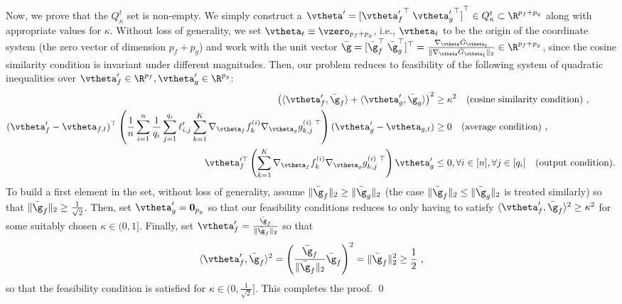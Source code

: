 Now, we prove that the $Q^t_{\kappa}$ set is non-empty. 
We simply construct a $\vtheta'={[{\vtheta'_f}^{\top}\;{\vtheta'_g}^{\top}]}^{\top} \in Q^t_{\kappa}\subset \R^{p_f+p_q}$ along with appropriate values for $\kappa$. Without loss of generality, we set $\vtheta_t\equiv \vzero_{p_f+p_g}$, i.e., $\vtheta_t$ to be the origin of the coordinate system (the zero vector of dimension $p_f+p_g$) and work with the unit vector $\bar{\g} = [\bar{\g}_f^{\top}\;\bar{\g}_g^{\top}]^{\top} =  \frac{\nabla_{\vtheta} \bar{G}_{\vtheta_t}}{\| \nabla_{\vtheta} \bar{G}_{\vtheta_t}\|_2}\in\R^{p_f+p_g}$, since the cosine similarity condition is invariant under different magnitudes. 
Then, our problem reduces to feasibility of the following system of quadratic inequalities over $\vtheta'_f \in \R^{p_f}, \vtheta'_g \in \R^{p_g}$:
\begin{align*}
  \left( \langle \vtheta'_f , \bar{\g}_f \rangle + \langle \vtheta'_g , \bar{\g}_g \rangle \right)^2  & \geq \kappa^2 \quad \text{(cosine similarity condition)}~, \\
  (\vtheta'_f-\vtheta_{f,t})^\top\left(\frac{1}{n} \sum_{i=1}^n \frac{1}{q_i} \sum_{j=1}^{q_i} \ell'_{i,j} \sum_{k=1}^K \nabla_{\vtheta_{f}} f_k^{(i)} \nabla_{\vtheta_{g}} g_{k,j}^{(i)~\top}\right)(\vtheta'_g-\vtheta_{g,t})  &\geq 0\quad \text{(average condition)}~,\\
  \vtheta_f^{\prime\top}\left( \sum_{k=1}^K \nabla_{\vtheta_{f}} f_k^{(i)} \nabla_{\vtheta_{g}} g_{k,j}^{(i)~\top}\right)\vtheta'_g&\leq 0,\forall i\in[n],\forall j\in[q_i]
\quad \text{(output condition)}.
\end{align*}
%
%
To build a first element in the set, without loss of generality, assume $\| \bar{\g}_f\|_2 \geq \| \bar{\g}_g \|_2$ (the case $\| \bar{\g}_f\|_2 \leq \| \bar{\g}_g \|_2$ is treated similarly) so that $\| \bar{\g}_f\|_2 \geq \frac{1}{\sqrt{2}}$. Then, set $\vtheta'_g = \mathbf{0}_{p_g}$ so that our feasibility conditions reduces to only having to satisfy $\langle \vtheta'_f, \bar{\g}_f \rangle^2 \geq \kappa^2$ for some suitably chosen $\kappa \in (0,1]$. Finally, set $\vtheta'_f = \frac{\bar{\g}_f}{\| \bar{\g}_f \|_2}$ so that 
\begin{align*}
\langle \vtheta'_f, \bar{\g}_f \rangle^2 = \left( \frac{\bar{\g}_f}{\| \bar{\g}_f \|_2} \bar{\g}_f  \right)^2 = \| \bar{\g}_f \|_2^2 \geq \frac{1}{2}~,
\end{align*}
so that the feasibility condition is satisfied for $\kappa \in (0,\frac{1}{\sqrt{2}}]$. This completes the proof. \qed 